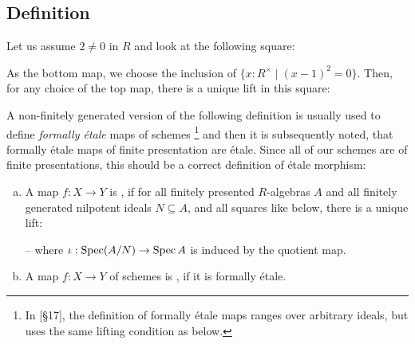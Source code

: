 \subsection{Definition}

\begin{example}
  Let us assume $2\neq 0$ in $R$ and look at the following square:
  \begin{center}
  \end{center}
  As the bottom map, we choose the inclusion of $\{x:R^\times \mid (x-1)^2=0 \}$.
  Then, for any choice of the top map, there is a unique lift in this square:
  \begin{center}
  \end{center}
\end{example}

A non-finitely generated version of the following definition is usually used
to define \emph{formally étale} maps of schemes
\footnote{In \cite{EGAIV3}[§17], the definition of formally étale maps ranges over arbitrary ideals, but uses the same lifting condition as below.}
and then it is subsequently noted,
that formally étale maps of finite presentation are étale.
Since all of our schemes are of finite presentations, this should be a correct definition of étale morphism:

\begin{definition}
  \begin{enumerate}[(a)]
  \item   A map $f:X\to Y$ is ,
    if for all finitely presented $R$-algebras $A$ and all finitely generated nilpotent ideals $N\subseteq A$,
    and all squares like below, there is a unique lift:
    \begin{center}
    \end{center}
    -- where $\iota:\operatorname{Spec} (A/N)\to \operatorname{Spec} A$ is induced by the quotient map.
  \item A map $f:X\to Y$ of schemes is , if it is formally étale.
  \end{enumerate}
\end{definition}

